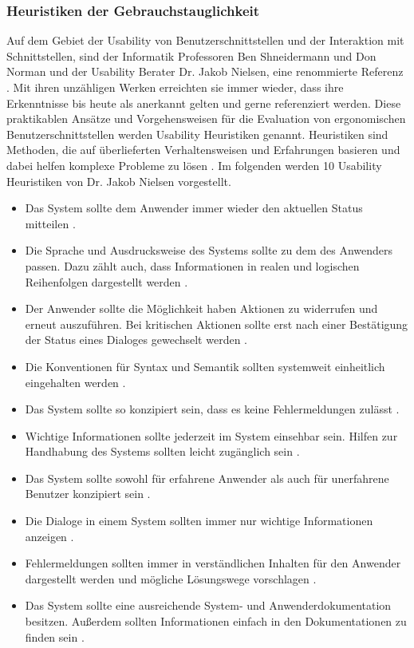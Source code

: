 \subsubsection{Heuristiken der Gebrauchstauglichkeit}
Auf dem Gebiet der Usability von Benutzerschnittstellen und der Interaktion mit Schnittstellen, sind der Informatik Professoren Ben Shneidermann und Don Norman und der Usability Berater Dr. Jakob Nielsen, eine renommierte Referenz \citep[vgl.][]{Wong2018}. Mit ihren unzähligen Werken erreichten sie immer wieder, dass ihre Erkenntnisse bis heute als anerkannt gelten und gerne referenziert werden. Diese praktikablen Ansätze und Vorgehensweisen für die Evaluation von ergonomischen Benutzerschnittstellen werden Usability Heuristiken genannt. Heuristiken sind Methoden, die auf überlieferten Verhaltensweisen und Erfahrungen basieren und dabei helfen komplexe Probleme zu lösen \citep[vgl.][]{Heuristik2018}. Im folgenden werden 10 Usability Heuristiken von Dr. Jakob Nielsen vorgestellt.
\begin{itemize}
    \item Das System sollte dem Anwender immer wieder den aktuellen Status mitteilen \citep[vgl.][]{Nielsen1995}.
    \item Die Sprache und Ausdrucksweise des Systems sollte zu dem des Anwenders passen. Dazu zählt auch, dass Informationen in realen und logischen Reihenfolgen dargestellt werden \citep[vgl.][]{Nielsen1995}.
    \item Der Anwender sollte die Möglichkeit haben Aktionen zu widerrufen und erneut auszuführen. Bei kritischen Aktionen sollte erst nach einer Bestätigung der Status eines Dialoges gewechselt werden \citep[vgl.][]{Nielsen1995}.
    \item Die Konventionen für Syntax und Semantik sollten systemweit einheitlich eingehalten werden \citep[vgl.][]{Nielsen1995}.
    \item Das System sollte so konzipiert sein, dass es keine Fehlermeldungen zulässt \citep[vgl.][]{Nielsen1995}.
    \item Wichtige Informationen sollte jederzeit im System einsehbar sein. Hilfen zur Handhabung des Systems sollten leicht zugänglich sein \citep[vgl.][]{Nielsen1995}.
    \item Das System sollte sowohl für erfahrene Anwender als auch für unerfahrene Benutzer konzipiert sein \citep[vgl.][]{Nielsen1995}.
    \item Die Dialoge in einem System sollten immer nur wichtige Informationen anzeigen \citep[vgl.][]{Nielsen1995}.
    \item Fehlermeldungen sollten immer in verständlichen Inhalten für den Anwender dargestellt werden und mögliche Lösungswege vorschlagen \citep[vgl.][]{Nielsen1995}.
    \item Das System sollte eine ausreichende System- und Anwenderdokumentation besitzen. Außerdem sollten Informationen einfach in den Dokumentationen zu finden sein \citep[vgl.][]{Nielsen1995}.
\end{itemize}

